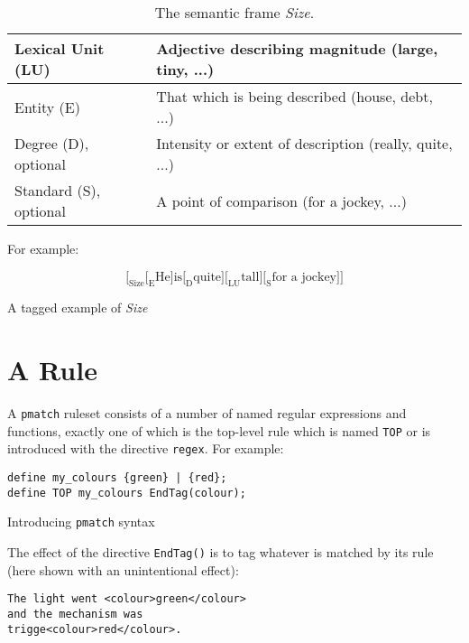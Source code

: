 \documentclass[11pt]{article}
\begin{document}
  \begin{center}
\begin{table}[h]
  \begin{tabular}{ | l | p{4cm} |}
\hline
Lexical Unit (LU) & Adjective describing magnitude (large, tiny, ...) \\
\hline
Entity (E) & That which is being described (house, debt, ...) \\
\hline
Degree (D), optional & Intensity or extent of description
(really, quite, ...) \\
\hline
Standard (S), optional & A point of comparison (for a jockey, ...) \\
\hline
    \end{tabular}
    \caption{The semantic frame \emph{Size}.}
\end{table}
      \end{center}

For example:

\begin{table}[h]
$$
\Big[_\text{Size}\Big[_\text{E}\text{He} \Big]
  \text{is} \Big[_\text{D} \text{quite} \Big] \Big[_\text{LU}\text{tall} \Big]
  \Big[_\text{S} \text{for a jockey} \Big] \Big]
$$
\caption{A tagged example of \emph{Size}}
\end{table}

\section{A Rule}

A \verb+pmatch+ ruleset consists of a number of named regular expressions and
functions, exactly one of which is the top-level rule which is named \verb+TOP+
or is introduced with the directive \verb+regex+. For example:

\begin{table}[h]
\small
\begin{framed}
\begin{verbatim}
define my_colours {green} | {red};
define TOP my_colours EndTag(colour);
\end{verbatim}
\end{framed}
\normalsize
\caption{Introducing \texttt{pmatch} syntax}
\end{table}

The effect of the directive \verb+EndTag()+ is to tag whatever is matched by its
rule (here shown with an unintentional effect):

  \small
  \begin{framed}
\begin{verbatim}
The light went <colour>green</colour>
and the mechanism was
trigge<colour>red</colour>.
\end{verbatim}
\end{framed}
  \normalsize
\end{document}
